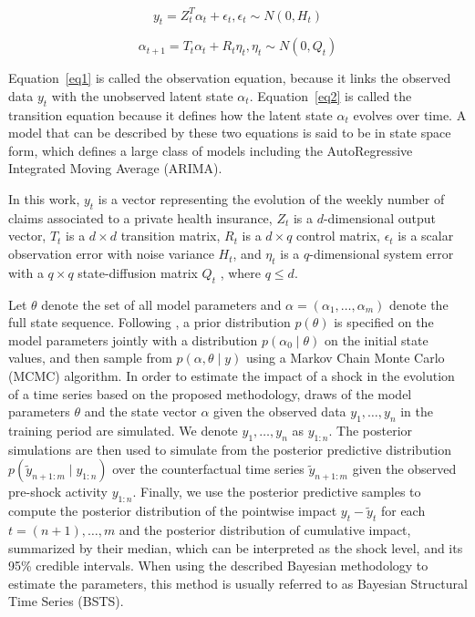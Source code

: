 \documentclass[]{risa}
\begin{document}
\begin{equation}\label{eq1}
y_t = Z_t^T \alpha_t + \epsilon_t, \epsilon_t \sim N(0, H_t)
\end{equation}

\begin{equation}\label{eq2}
\alpha_{t+1} = T_t \alpha_t + R_t \eta_t, \eta_t \sim N(0, Q_t)
\end{equation}

Equation~\ref{eq1} is called the observation equation, because it links the observed data $y_t$ with the unobserved latent state $\alpha_t$. Equation~\ref{eq2} is called the transition equation because it defines how the latent state $\alpha_t$ evolves over time. A model that can be described by these two equations is said to be in state space form, which defines a large class of models including the AutoRegressive Integrated Moving Average\cite{scott_predicting_nodate} (ARIMA). 

In this work, $y_t$ is a vector representing the evolution of the weekly number of claims associated to a private health insurance, $Z_t$ is a $d$-dimensional output vector, $T_t$ is a $d \times d$ transition matrix, $R_t$ is a $d \times q$ control matrix, $\epsilon_t$ is a scalar observation error with noise variance $H_t$, and $\eta_t$ is a $q$-dimensional system error with a $q \times q$ state-diffusion matrix $Q_t$ , where $q \leq d$. 

Let $\theta$ denote the set of all model parameters and $\alpha = (\alpha_1, \ldots, \alpha_m)$ denote the full state sequence. Following \cite{brodersen_inferring_2015}, a prior distribution $p(\theta)$ is specified on the model parameters jointly with a distribution $p(\alpha_0 \mid \theta)$ on the initial state values, and then sample from $p(\alpha, \theta \mid y)$ using a Markov Chain Monte Carlo (MCMC) algorithm. In order to estimate the impact of a shock in the evolution of a time series based on the proposed methodology, draws of the model parameters $\theta$ and the state vector $\alpha$ given the observed data $y_1, \ldots, y_n$ in the training period are simulated. We denote $y_1, \ldots, y_n$ as  $y_{1:n}$. The posterior simulations are then used to simulate from the posterior predictive distribution $p(\tilde{y}_{n+1:m} \mid y_{1:n})$ over the counterfactual time series $\tilde{y}_{n+1:m}$ given the observed pre-shock activity $y_{1:n}$. Finally, we use the posterior predictive samples to compute the posterior distribution of the pointwise impact $y_t - \tilde{y}_t$ for each $t=(n+1), \ldots, m$ and the posterior distribution of cumulative impact, summarized by their median,  which can be interpreted as the shock level, and its 95\% credible intervals. When using the described Bayesian methodology to estimate the parameters, this method is usually referred to as Bayesian Structural Time Series (BSTS).
\end{document}

